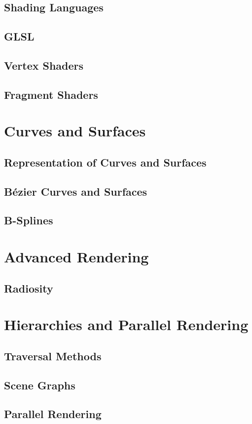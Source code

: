 \documentclass[11pt,a4paper]{article}
\begin{document}
	\subsection{Shading Languages}
	\subsection{GLSL}
	\subsection{Vertex Shaders}
	\subsection{Fragment Shaders}

\section{Curves and Surfaces}
	\subsection{Representation of Curves and Surfaces}
	\subsection{Bézier Curves and Surfaces}
	\subsection{B-Splines}

\section{Advanced Rendering}
	\subsection{Radiosity}

\section{Hierarchies and Parallel Rendering}
	 \subsection{Traversal Methods}
	 \subsection{Scene Graphs}
	 \subsection{Parallel Rendering}
\end{document}
